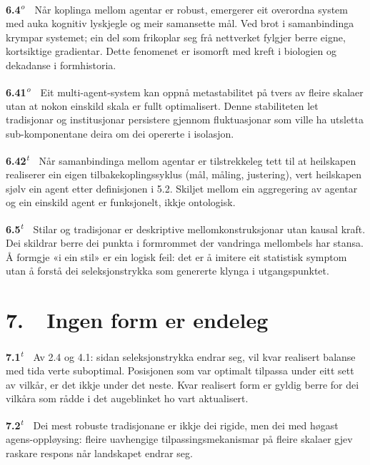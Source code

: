 \documentclass[10pt]{article}
\begin{document}
\noindent\textbf{6.4}\textsuperscript{\textit{o}}~~Når koplinga mellom agentar er robust, emergerer eit overordna system med auka kognitiv lyskjegle og meir samansette mål. Ved brot i samanbindinga krympar systemet; ein del som frikoplar seg frå nettverket fylgjer berre eigne, kortsiktige gradientar. Dette fenomenet er isomorft med kreft i biologien og dekadanse i formhistoria.




\noindent\textbf{6.41}\textsuperscript{\textit{o}}~~Eit multi-agent-system kan oppnå metastabilitet på tvers av fleire skalaer utan at nokon einskild skala er fullt optimalisert. Denne stabiliteten let tradisjonar og institusjonar persistere gjennom fluktuasjonar som ville ha utsletta sub-komponentane deira om dei opererte i isolasjon.




\noindent\textbf{6.42}\textsuperscript{\textit{t}}~~Når samanbindinga mellom agentar er tilstrekkeleg tett til at heilskapen realiserer ein eigen tilbakekoplingssyklus (mål, måling, justering), vert heilskapen sjølv ein agent etter definisjonen i 5.2. Skiljet mellom ein aggregering av agentar og ein einskild agent er funksjonelt, ikkje ontologisk.




\noindent\textbf{6.5}\textsuperscript{\textit{t}}~~Stilar og tradisjonar er deskriptive mellomkonstruksjonar utan kausal kraft. Dei skildrar berre dei punkta i formrommet der vandringa mellombels har stansa. Å formgje «i ein stil» er ein logisk feil: det er å imitere eit statistisk symptom utan å forstå dei seleksjonstrykka som genererte klynga i utgangspunktet.







\chapter*{7.~~Ingen form er endeleg}




\noindent\textbf{7.1}\textsuperscript{\textit{t}}~~Av 2.4 og 4.1: sidan seleksjonstrykka endrar seg, vil kvar realisert balanse med tida verte suboptimal. Posisjonen som var optimalt tilpassa under eitt sett av vilkår, er det ikkje under det neste. Kvar realisert form er gyldig berre for dei vilkåra som rådde i det augeblinket ho vart aktualisert.




\noindent\textbf{7.2}\textsuperscript{\textit{t}}~~Dei mest robuste tradisjonane er ikkje dei rigide, men dei med høgast agens-oppløysing: fleire uavhengige tilpassingsmekanismar på fleire skalaer gjev raskare respons når landskapet endrar seg.
\end{document}
